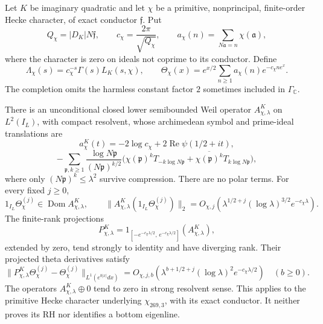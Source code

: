 \begin{theorem}
\label{AC-S27}
Let \(K\) be imaginary quadratic and let \(\chi\) be a primitive,
nonprincipal, finite-order Hecke character, of exact conductor
\(\mathfrak f\).  Put
\[
 Q_\chi=|D_K|N\mathfrak f,\qquad c_\chi=\frac{2\pi}{\sqrt{Q_\chi}},
 \qquad
 a_\chi(n)=\sum_{N\mathfrak a=n}\chi(\mathfrak a),
\]
where the character is zero on ideals not coprime to its conductor.
Define
\[
 \Lambda_\chi(s)=c_\chi^{-s}\Gamma(s)L_K(s,\chi),\qquad
 \Theta_\chi(x)=e^{x/2}
             \sum_{n\geq1}a_\chi(n)e^{-c_\chi n e^x}.
                                                               \tag{SB.18}
\]
The completion omits the harmless constant factor \(2\) sometimes
included in \(\Gamma_{\mathbb C}\).

There is an unconditional closed lower semibounded Weil operator
\(A^K_{\chi,\lambda}\) on \(L^2(I_L)\), with compact resolvent,
whose archimedean symbol and prime-ideal translations are
\[
 a^K_\chi(t)=-2\log c_\chi+
                  2\operatorname{Re}\psi(1/2+it),               \tag{SB.19}
\]
\[
 -\sum_{\mathfrak p,k\geq1}
 \frac{\log N\mathfrak p}{(N\mathfrak p)^{k/2}}
 \bigl(\chi(\mathfrak p)^kT_{-k\log N\mathfrak p}
       +\overline{\chi(\mathfrak p)^k}T_{k\log N\mathfrak p}\bigr),
                                                               \tag{SB.20}
\]
where only \((N\mathfrak p)^k\leq\lambda^2\) survive compression.
There are no polar terms.
For every fixed \(j\geq0\),
\[
 1_{I_L}\Theta_\chi^{(j)}
        \in\operatorname{Dom}A^K_{\chi,\lambda},\qquad
 \|A^K_{\chi,\lambda}(1_{I_L}\Theta_\chi^{(j)})\|_2
 =O_{\chi,j}\!\left(
       \lambda^{1/2+j}(\log\lambda)^{3/2}e^{-c_\chi\lambda}\right).
                                                               \tag{SB.21}
\]
The finite-rank projections
\[
 P^K_{\chi,\lambda}
   =1_{[-e^{-c_\chi\lambda/2},\,e^{-c_\chi\lambda/2}]}
                                      (A^K_{\chi,\lambda}),
\]
extended by zero, tend strongly to identity and have diverging rank.
Their projected theta derivatives satisfy
\[
 \|P^K_{\chi,\lambda}\Theta_\chi^{(j)}
                   -\Theta_\chi^{(j)}\|_{L^1(e^{b|x|}dx)}
 =O_{\chi,j,b}\!\left(
 \lambda^{b+1/2+j}(\log\lambda)^2e^{-c_\chi\lambda/2}\right)
 \quad(b\geq0).                                                \tag{SB.22}
\]
The operators \(A^K_{\chi,\lambda}\oplus0\) tend to zero in
strong resolvent sense.  This applies to the primitive Hecke
character underlying \(\chi_{269,3}\), with its exact conductor.
It neither proves its RH nor identifies a bottom eigenline.
\end{theorem}
